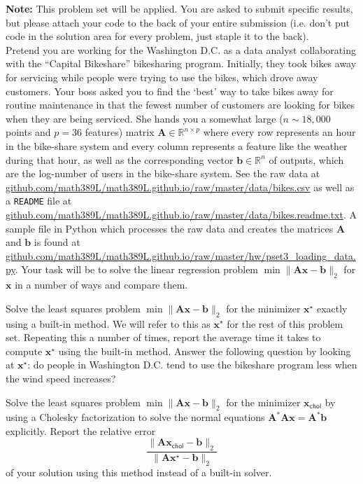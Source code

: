 \documentclass[12pt,letterpaper,cm]{hmcpset}
\newcommand\A{\boldsymbol{A}}
\renewcommand\b{\boldsymbol{b}}
\newcommand\x{\boldsymbol{x}}
\begin{document}
\textbf{Note:} This problem set will be applied. You are asked to submit specific results, but please attach your code to the back of your entire submission (i.e. don't put code in the solution area for every problem, just staple it to the back).\\

Pretend you are working for the Washington D.C. as a data analyst collaborating with the ``Capital Bikeshare'' bikesharing program. Initially, they took bikes away for servicing while people were trying to use the bikes, which drove away customers. Your boss asked you to find the `best' way to take bikes away for routine maintenance in that the fewest number of customers are looking for bikes when they are being serviced. She hands you a somewhat large ($n\sim 18,000$ points and $p=36$ features) matrix $\A\in\mathbb{R}^{n\times p}$ where every row represents an hour in the bike-share system and every column represents a feature like the weather during that hour, as well as the corresponding vector $\b\in\mathbb{R}^n$ of outputs, which are the log-number of users in the bike-share system. See the raw data at \url{github.com/math389L/math389L.github.io/raw/master/data/bikes.csv} as well as a \verb+README+ file at \url{github.com/math389L/math389L.github.io/raw/master/data/bikes.readme.txt}. A sample file in Python which processes the raw data and creates the matrices $\A$ and $\b$ is found at \url{github.com/math389L/math389L.github.io/raw/master/hw/pset3_loading_data.py}. Your task will be to solve the linear regression problem $\min\|\A\x - \b\|_2$ for $\x$ in a number of ways and compare them.

\begin{problem}[1]
    Solve the least squares problem $\min\|\A\x - \b\|_2$ for the minimizer $\x^\star$ exactly using a built-in method. We will refer to this as $\x^\star$ for the rest of this problem set. Repeating this a number of times, report the average time it takes to compute $\x^\star$ using the built-in method. Answer the following question by looking at $\x^\star$: do people in Washington D.C. tend to use the bikeshare program less when the wind speed increases?
\end{problem}

\begin{solution}
\end{solution}

\begin{problem}[2]
    Solve the least squares problem $\min\|\A\x - \b\|_2$ for the minimizer $\x_\textsf{chol}$ by using a Cholesky factorization to solve the normal equations $\A^*\A\x = \A^*\b$ explicitly. Report the relative error
    \[
        \frac{\|\A\x_\textsf{chol} - \b\|_2}{\|\A\x^\star - \b\|_2}
    \]
    of your solution using this method instead of a built-in solver.
\end{problem}
\end{document}

